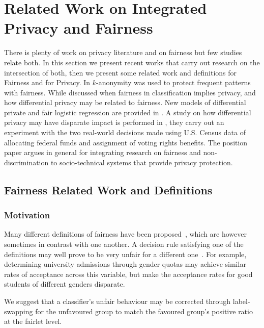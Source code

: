 \section{Related Work on Integrated Privacy and Fairness}
\label{sec:related}
There is plenty of work on privacy literature and on fairness but few studies relate both. In this section we present recent works that carry out research on the intersection of both, then we present some related work and definitions for Fairness and for Privacy.
In \cite{Hajian:2015} $k$-anonymity was used to protect frequent patterns with fairness.
While \cite{Dwork:2012} discussed when fairness in classification implies privacy, and how differential privacy may be related to fairness. New models of differential private and fair logistic regression are provided in \cite{Xu:2019}. A study on how differential privacy may have disparate impact is performed in \cite{Pujol:2020}, they carry out an experiment with the two real-world decisions made using U.S. Census data of allocating federal funds and assignment of voting rights benefits. 
The position paper \cite{Ekstrand:2018} argues in general for integrating research on fairness and non-discrimination to socio-technical systems that provide privacy protection.

\subsection{Fairness Related Work and Definitions}

\subsubsection{Motivation}

Many different definitions of fairness have been proposed~\cite{kusner2017counterfactual}, which are however sometimes in contrast with one another. A decision rule satisfying one of the definitions may well prove to be very unfair for a different one~\cite{chouldechova2017fair}. For example, determining university admissions through gender quotas may achieve similar rates of acceptance across this variable, but make the acceptance rates for good students of different genders disparate.

We suggest that a classifier's unfair behaviour may be corrected through label-swapping for the unfavoured group to match the favoured group's positive ratio at the fairlet level. 

